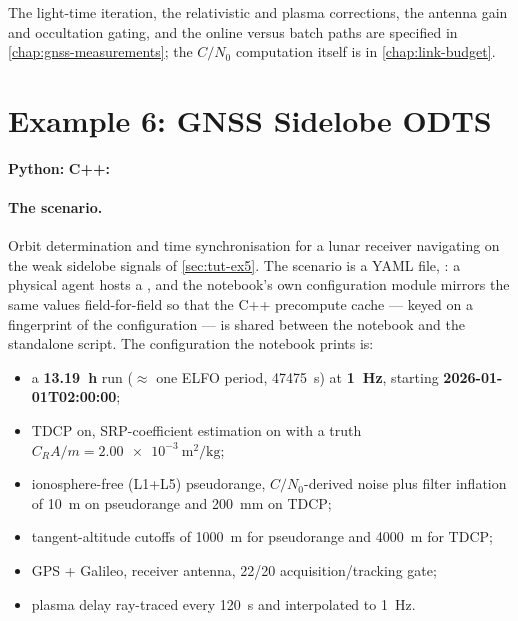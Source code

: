 The light-time iteration, the relativistic and plasma corrections, the antenna
gain and occultation gating, and the online versus batch  paths
are specified in \cref{chap:gnss-measurements}; the $C/N_0$ computation itself
is in \cref{chap:link-budget}.

\section{Example 6: GNSS Sidelobe ODTS}
\label{sec:tut-ex6}

\textbf{Python:}  \quad
\textbf{C++:} 

\paragraph{The scenario.}
Orbit determination and time synchronisation for a lunar receiver navigating on
the weak sidelobe signals of \cref{sec:tut-ex5}. The scenario is a YAML file,
: a physical  
agent hosts a , and the notebook's own configuration
module mirrors the same values field-for-field so that the C++ precompute cache
--- keyed on a fingerprint of the configuration --- is shared between the
notebook and the standalone script. The configuration the notebook prints is:

\begin{itemize}[nosep]
  \item a \textbf{\SI{13.19}{\hour}} run ($\approx$ one ELFO period,
        \SI{47475}{\second}) at \textbf{\SI{1}{\hertz}}, starting
        \textbf{2026-01-01T02:00:00};
  \item TDCP on, SRP-coefficient estimation on with a truth
        $C_R A/m = \SI{2.00e-3}{\meter\squared\per\kilogram}$;
  \item ionosphere-free (L1+L5) pseudorange, $C/N_0$-derived noise plus filter
        inflation of \SI{10}{\meter} on pseudorange and \SI{200}{\milli\meter}
        on TDCP;
  \item tangent-altitude cutoffs of \SI{1000}{\meter} for pseudorange and
        \SI{4000}{\meter} for TDCP;
  \item GPS + Galileo,  receiver antenna, \SI{22}{}/\SI{20}{\dBHz}
        acquisition/tracking gate;
  \item plasma delay ray-traced every \SI{120}{\second} and interpolated to
        \SI{1}{\hertz}.
\end{itemize}

